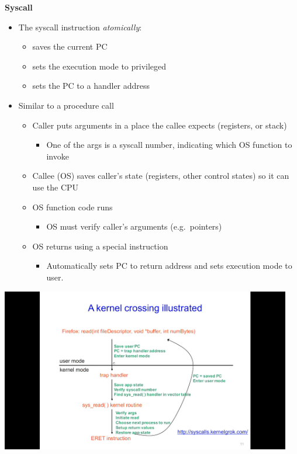 \documentclass[11pt,a4paper]{article}
\begin{document}
\textbf{Syscall}
\begin{itemize}
    \item The syscall instruction \emph{atomically}:
        \begin{itemize}
            \item saves the current PC
            \item sets the execution mode to privileged
            \item sets the PC to a handler address
        \end{itemize}
    \item Similar to a procedure call
        \begin{itemize}
            \item Caller puts arguments in a place the callee expects (registers, or stack)
                \begin{itemize}
                    \item One of the args is a syscall number, indicating which OS function
                        to invoke
                \end{itemize}
            \item Callee (OS) saves caller's state (registers, other control states) so it can
                use the CPU
            \item OS function code runs
                \begin{itemize}
                    \item OS must verify caller's arguments (e.g.\ pointers)
                \end{itemize}
            \item OS returns using a special instruction
                \begin{itemize}
                    \item Automatically sets PC to return address and sets execution mode to
                        user.
                \end{itemize}
        \end{itemize}
\end{itemize}

\begin{center}{}
    \includegraphics[height=270]{a-kernel-crossing-illustrated.jpg}
\end{center}
\end{document}
